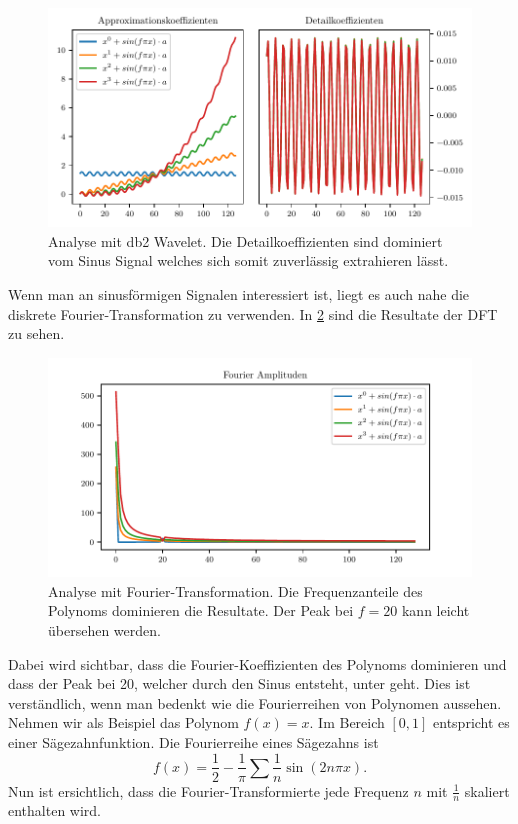 \begin{refsection}
\begin{figure}
    \centering
    \includegraphics{papers/polynomials/images/polynomials_sin_db2.pdf}
    \caption{Analyse mit db2 Wavelet. Die Detailkoeffizienten sind dominiert
             vom Sinus Signal welches sich somit zuverlässig extrahieren
             lässt.\label{polynomials:sin:db2}}
\end{figure}

Wenn man an sinusförmigen Signalen interessiert ist, liegt es auch nahe die
diskrete Fourier-Transformation zu verwenden. In \cref{polynomials:sin:fft}
sind die Resultate der DFT zu sehen.
\begin{figure}
    \centering
    \includegraphics{papers/polynomials/images/polynomials_sin_fft.pdf}
    \caption{Analyse mit Fourier-Transformation. Die Frequenzanteile des
             Polynoms dominieren die Resultate. Der Peak bei $f=20$ kann leicht
             übersehen werden.\label{polynomials:sin:fft}}
\end{figure}
Dabei wird sichtbar, dass die Fourier-Koeffizienten des Polynoms dominieren und
dass der Peak bei 20, welcher durch den Sinus entsteht, unter geht. Dies ist
verständlich, wenn man bedenkt wie die Fourierreihen von Polynomen aussehen.
Nehmen wir als Beispiel das Polynom $f(x) = x$. Im Bereich $[0, 1]$ entspricht
es einer Sägezahnfunktion. Die Fourierreihe eines Sägezahns ist \[f(x) =
\frac{1}{2} - \frac{1}{\pi} \sum{\frac{1}{n} \sin(2 n \pi x)}.\] Nun ist
ersichtlich, dass die Fourier-Transformierte jede Frequenz $n$ mit
$\frac{1}{n}$ skaliert enthalten wird.


\end{refsection}
